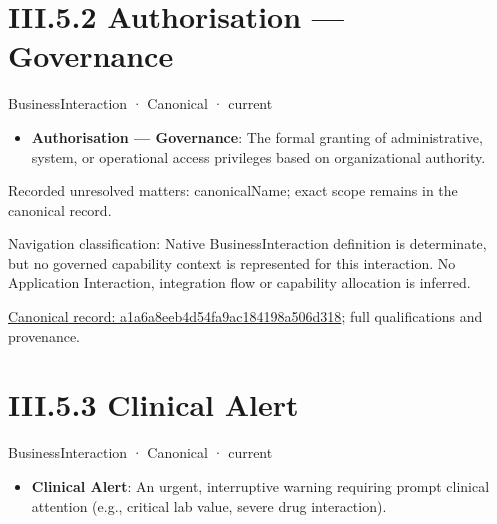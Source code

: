 \section*{III.5.2 Authorisation — Governance}
\label{navigation:III.5.2}

\label{element:a1a6a8eeb4d54fa9ac184198a506d318}
{\small BusinessInteraction · Canonical · current}\par

\begin{itemize}


\item \textbf{Authorisation — Governance}: The formal granting of administrative, system, or operational access privileges based on organizational authority.

\end{itemize}

{\small Recorded unresolved matters: canonicalName; exact scope remains in the canonical record.}\par
{\small Navigation classification: Native BusinessInteraction definition is determinate, but no governed capability context is represented for this interaction. No Application Interaction, integration flow or capability allocation is inferred.}\par
{\footnotesize \href{../../../../../../../../continuum/business/business-interaction/a1a6a8eeb4d54fa9ac184198a506d318.md}{Canonical record: a1a6a8eeb4d54fa9ac184198a506d318}; full qualifications and provenance.}\par
\section*{III.5.3 Clinical Alert}
\label{navigation:III.5.3}

\label{element:8666d4168fe545fd9ce222217887bd61}
{\small BusinessInteraction · Canonical · current}\par

\begin{itemize}


\item \textbf{Clinical Alert}: An urgent, interruptive warning requiring prompt clinical attention (e.g., critical lab value, severe drug interaction).

\end{itemize}

